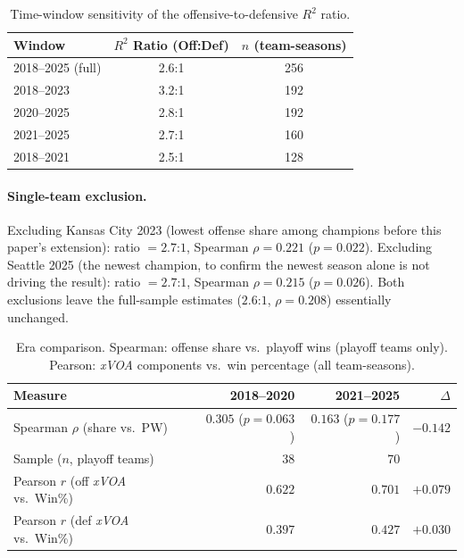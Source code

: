 \documentclass[12pt,a4paper]{article}
\newcommand{\xvoa}{\textit{xVOA}}
\begin{document}
\begin{table}[htbp]
  \centering
  \caption{Time-window sensitivity of the offensive-to-defensive $R^2$ ratio.}
  \begin{tabular}{lcc}
    \toprule
    \textbf{Window} & \textbf{$R^2$ Ratio (Off:Def)} & \textbf{$n$ (team-seasons)} \\
    \midrule
    2018--2025 (full) & 2.6:1 & 256 \\
    2018--2023        & 3.2:1 & 192 \\
    2020--2025        & 2.8:1 & 192 \\
    2021--2025        & 2.7:1 & 160 \\
    2018--2021        & 2.5:1 & 128 \\
    \bottomrule
  \end{tabular}
\end{table}

\paragraph{Single-team exclusion.} Excluding Kansas City 2023 (lowest offense share among
champions before this paper's extension): ratio $= 2.7$:$1$, Spearman $\rho = 0.221$
($p = 0.022$). Excluding Seattle 2025 (the newest champion, to confirm the newest season alone
is not driving the result): ratio $= 2.7$:$1$, Spearman $\rho = 0.215$ ($p = 0.026$). Both
exclusions leave the full-sample estimates ($2.6$:$1$, $\rho = 0.208$) essentially unchanged.

\begin{table}[htbp]
  \centering
  \caption{Era comparison. Spearman: offense share vs.\ playoff wins (playoff teams only).
  Pearson: \xvoa{} components vs.\ win percentage (all team-seasons).}
  \begin{tabular}{lrrr}
    \toprule
    \textbf{Measure} & \textbf{2018--2020} & \textbf{2021--2025} & \textbf{$\Delta$} \\
    \midrule
    Spearman $\rho$ (share vs.\ PW)      & $0.305$ ($p=0.063$) & $0.163$ ($p=0.177$) & $-0.142$ \\
    Sample ($n$, playoff teams)          & 38                  & 70                   & \\[4pt]
    Pearson $r$ (off \xvoa{} vs.\ Win\%) & $0.622$             & $0.701$              & $+0.079$ \\
    Pearson $r$ (def \xvoa{} vs.\ Win\%) & $0.397$             & $0.427$              & $+0.030$ \\
    \bottomrule
  \end{tabular}
\end{table}
\end{document}
